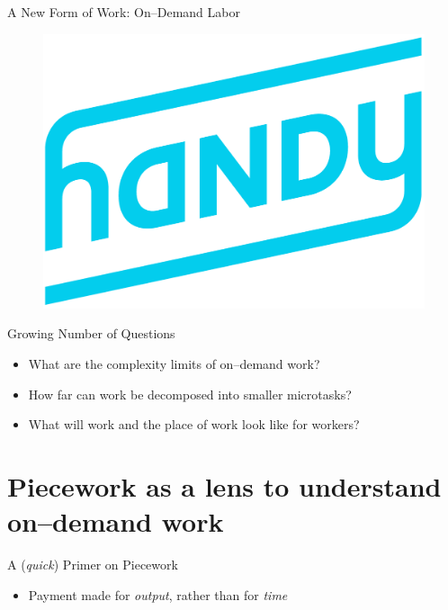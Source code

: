 \documentclass{beamer}
\begin{document}
\begin{frame}{A New Form of Work: On--Demand Labor}
\begin{itemize}[<+- | alert@+>]
\begin{figure}
    \includegraphics[scale=0.15]{figures/handy.png}
    \end{figure}
  \end{itemize}
\end{frame}


\begin{frame}{Growing Number of Questions}
\begin{itemize}[<+- | alert@+>]
  \item What are the complexity limits of on--demand work?
  \item How far can work be decomposed into smaller microtasks?
  \item What will work and the place of work look like for workers?
\end{itemize}


\end{frame}


\section{Piecework as a lens to understand on--demand work}


\begin{frame}{A (\textit{quick}) Primer on Piecework}
  \begin{itemize}[<+- | alert@+>]
    \item Payment made for \textit{output}, rather than for \textit{time}
  \end{itemize}
\end{frame}
\end{document}
